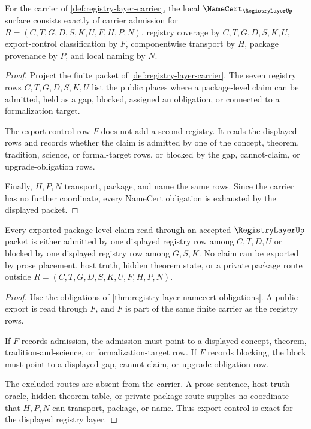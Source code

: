 \begin{theorem}
\label{thm:registry-layer-namecert-obligations}
For the carrier of \autoref{def:registry-layer-carrier}, the local $\NameCert_{\RegistryLayerUp}$ surface consists exactly of carrier admission for $R=(C,T,G,D,S,K,U,F,H,P,N)$, registry coverage by $C,T,G,D,S,K,U$, export-control classification by $F$, componentwise transport by $H$, package provenance by $P$, and local naming by $N$.
\end{theorem}
\begin{proof}
Project the finite packet of \autoref{def:registry-layer-carrier}. The seven registry rows $C,T,G,D,S,K,U$ list the public places where a package-level claim can be admitted, held as a gap, blocked, assigned an obligation, or connected to a formalization target.

The export-control row $F$ does not add a second registry. It reads the displayed rows and records whether the claim is admitted by one of the concept, theorem, tradition, science, or formal-target rows, or blocked by the gap, cannot-claim, or upgrade-obligation rows.

Finally, $H,P,N$ transport, package, and name the same rows. Since the carrier has no further coordinate, every NameCert obligation is exhausted by the displayed packet.
\end{proof}

\begin{theorem}
\label{thm:registry-layer-export-control-exactness}
Every exported package-level claim read through an accepted $\RegistryLayerUp$ packet is either admitted by one displayed registry row among $C,T,D,U$ or blocked by one displayed registry row among $G,S,K$. No claim can be exported by prose placement, host truth, hidden theorem state, or a private package route outside $R=(C,T,G,D,S,K,U,F,H,P,N)$.
\end{theorem}
\begin{proof}
Use the obligations of \autoref{thm:registry-layer-namecert-obligations}. A public export is read through $F$, and $F$ is part of the same finite carrier as the registry rows.

If $F$ records admission, the admission must point to a displayed concept, theorem, tradition-and-science, or formalization-target row. If $F$ records blocking, the block must point to a displayed gap, cannot-claim, or upgrade-obligation row.

The excluded routes are absent from the carrier. A prose sentence, host truth oracle, hidden theorem table, or private package route supplies no coordinate that $H,P,N$ can transport, package, or name. Thus export control is exact for the displayed registry layer.
\end{proof}

